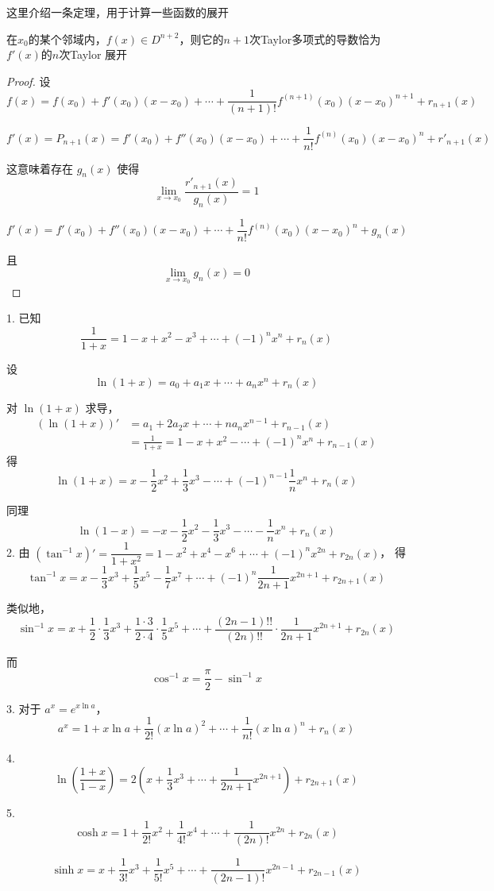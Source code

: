 这里介绍一条定理，用于计算一些函数的展开
\begin{proposition}
	在$x_0$的某个邻域内，$f(x)\in D^{n+2}$，则它的$n+1$次Taylor多项式的导数恰为$f'(x)$的$n$次Taylor 展开
\end{proposition}
\begin{proof}
	设
	\[
	f(x) = f(x_0) + f'(x_0)(x-x_0) + \cdots + \frac{1}{(n+1)!} f^{(n+1)}(x_0)(x-x_0)^{n+1} + r_{n+1}(x)
	\]
	
	\[
	f'(x) = P_{n+1}(x) = f'(x_0) + f''(x_0)(x-x_0) + \cdots + \frac{1}{n!} f^{(n)}(x_0)(x-x_0)^n + r'_{n+1}(x)
	\]
	
	这意味着存在 $g_n(x)$ 使得
	\[
	\lim_{x \to x_0} \frac{r'_{n+1}(x)}{g_n(x)} = 1
	\]
	
	\[
	f'(x) = f'(x_0) + f''(x_0)(x-x_0) + \cdots + \frac{1}{n!} f^{(n)}(x_0)(x-x_0)^n + g_n(x)
	\]
	
	且
	\[
	\lim_{x \to x_0} g_n(x) = 0
	\]
\end{proof}
\begin{proposition}
	1. 已知
	\[
	\frac{1}{1+x} = 1 - x + x^2 - x^3 + \cdots + (-1)^n x^n + r_n(x)
	\]
	
	设
	\[
	\ln(1+x) = a_0 + a_1 x + \cdots + a_n x^n + r_n(x)
	\]
	
	对 $\ln(1+x)$ 求导，
	\[\begin{aligned}
		(\ln(1+x))' &= a_1 + 2a_2 x + \cdots + n a_n x^{n-1} + r_{n-1}(x)\\&= \frac{1}{1+x} = 1 - x + x^2 - \cdots + (-1)^n x^n + r_{n-1}(x)
	\end{aligned}\]
	得
	\[
	\ln(1+x) = x - \frac{1}{2}x^2 + \frac{1}{3}x^3 - \cdots + (-1)^{n-1} \frac{1}{n} x^n + r_n(x)
	\]
	
	同理
	\[
	\ln(1-x) = -x - \frac{1}{2}x^2 - \frac{1}{3}x^3 - \cdots - \frac{1}{n}x^n + r_n(x)
	\]
	2. 由 $(\tan^{-1} x)' = \dfrac{1}{1+x^2} = 1 - x^2 + x^4 - x^6 + \cdots + (-1)^n x^{2n} + r_{2n}(x)$，
	得
	\[
	\tan^{-1} x = x - \frac{1}{3}x^3 + \frac{1}{5}x^5 - \frac{1}{7}x^7 + \cdots + (-1)^n \frac{1}{2n+1} x^{2n+1} + r_{2n+1}(x)
	\]
	
	类似地，
	\[
	\sin^{-1} x = x + \frac{1}{2} \cdot \frac{1}{3} x^3 + \frac{1 \cdot 3}{2 \cdot 4} \cdot \frac{1}{5} x^5 + \cdots + \frac{(2n-1)!!}{(2n)!!} \cdot \frac{1}{2n+1} x^{2n+1} + r_{2n}(x)
	\]
	
	而
	\[
	\cos^{-1} x = \frac{\pi}{2} - \sin^{-1} x
	\]
	
	3. 对于 $a^x = e^{x \ln a}$，
	\[
	a^x = 1 + x \ln a + \frac{1}{2!} (x \ln a)^2 + \cdots + \frac{1}{n!} (x \ln a)^n + r_n(x)
	\]
	
	4.
	\[
	\ln \left(\frac{1+x}{1-x}\right) = 2 \left(x + \frac{1}{3}x^3 + \cdots + \frac{1}{2n+1}x^{2n+1}\right) + r_{2n+1}(x)
	\]
	
	5.
	\[
	\cosh x = 1 + \frac{1}{2!}x^2 + \frac{1}{4!}x^4 + \cdots + \frac{1}{(2n)!}x^{2n} + r_{2n}(x)
	\]
	
	\[
	\sinh x = x + \frac{1}{3!}x^3 + \frac{1}{5!}x^5 + \cdots + \frac{1}{(2n-1)!}x^{2n-1} + r_{2n-1}(x)
	\]
\end{proposition}

